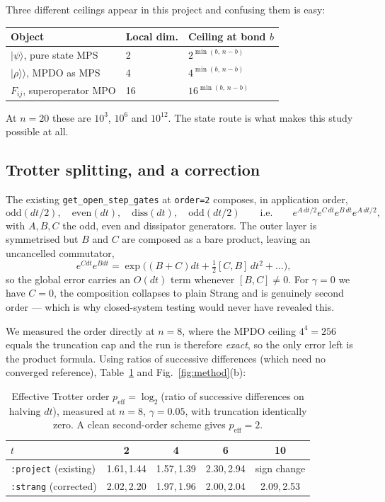 \documentclass[11pt,a4paper]{article}
\begin{document}
Three different ceilings appear in this project and confusing them is easy:
\begin{center}
\begin{tabular}{lll}
\toprule
Object & Local dim. & Ceiling at bond $b$ \\
\midrule
$|\psi\rangle$, pure state MPS & 2 & $2^{\min(b,\,n-b)}$ \\
$|\rho\rangle\rangle$, MPDO as MPS & 4 & $4^{\min(b,\,n-b)}$ \\
$F_{ij}$, superoperator MPO & 16 & $16^{\min(b,\,n-b)}$ \\
\bottomrule
\end{tabular}
\end{center}
At $n=20$ these are $10^3$, $10^6$ and $10^{12}$. The state route is what makes
this study possible at all.

\subsection{Trotter splitting, and a correction}
\label{sec:trotter}

The existing \texttt{get\_open\_step\_gates} at \texttt{order=2} composes, in
application order,
\begin{equation*}
  \mathrm{odd}(dt/2),\quad \mathrm{even}(dt),\quad \mathrm{diss}(dt),\quad
  \mathrm{odd}(dt/2)
  \qquad\text{i.e.}\qquad e^{A\,dt/2}e^{C\,dt}e^{B\,dt}e^{A\,dt/2},
\end{equation*}
with $A,B,C$ the odd, even and dissipator generators. The outer layer is symmetrised but $B$ and $C$ are
composed as a bare product, leaving an uncancelled commutator,
\begin{equation}
  e^{Cdt}e^{Bdt} = \exp\!\Big((B+C)dt + \tfrac12[C,B]\,dt^2+\dots\Big),
\end{equation}
so the global error carries an $O(dt)$ term whenever $[B,C]\neq0$. For
$\gamma=0$ we have $C=0$, the composition collapses to plain Strang and is
genuinely second order --- which is why closed-system testing would never have
revealed this.

We measured the order directly at $n=8$, where the MPDO ceiling $4^4=256$ equals
the truncation cap and the run is therefore \emph{exact}, so the only error left
is the product formula. Using ratios of successive differences (which need no
converged reference), Table~\ref{tab:order} and Fig.~\ref{fig:method}(b):

\begin{table}[h]
\centering
\caption{Effective Trotter order $p_{\mathrm{eff}}=\log_2$(ratio of successive
differences on halving $dt$), measured at $n=8$, $\gamma=0.05$, with truncation
identically zero. A clean second-order scheme gives $p_{\mathrm{eff}}=2$.}
\label{tab:order}
\begin{tabular}{lcccc}
\toprule
$t$ & 2 & 4 & 6 & 10 \\
\midrule
\texttt{:project} (existing) & 1.61,\,1.44 & 1.57,\,1.39 & 2.30,\,2.94 & sign change \\
\texttt{:strang} (corrected) & 2.02,\,2.20 & 1.97,\,1.96 & 2.00,\,2.04 & 2.09,\,2.53 \\
\bottomrule
\end{tabular}
\end{table}
\end{document}
